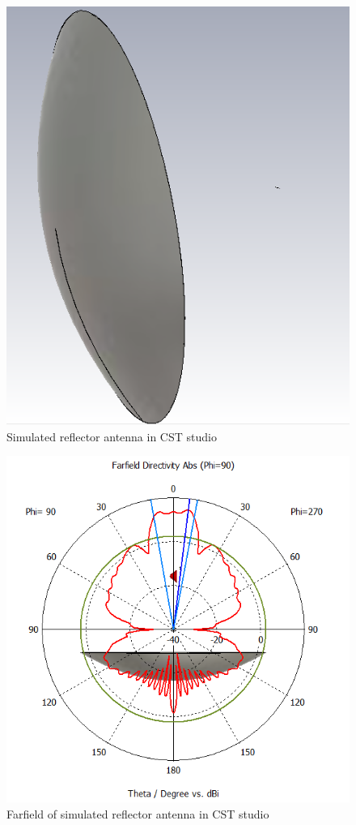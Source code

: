 \begin{figure}[H]
\centering 
\includegraphics[scale = 0.5]{figures/antennas/reflector/parabola_cst}
\caption{Simulated reflector antenna in CST studio}
\label{fig:para_sim1}
\end{figure}

\begin{figure}[H]
\centering 
\includegraphics[scale = 0.5]{figures/antennas/reflector/parabola_cst_farfield}
\caption{Farfield of simulated reflector antenna in CST studio}
\label{fig:para_sim2}
\end{figure}



